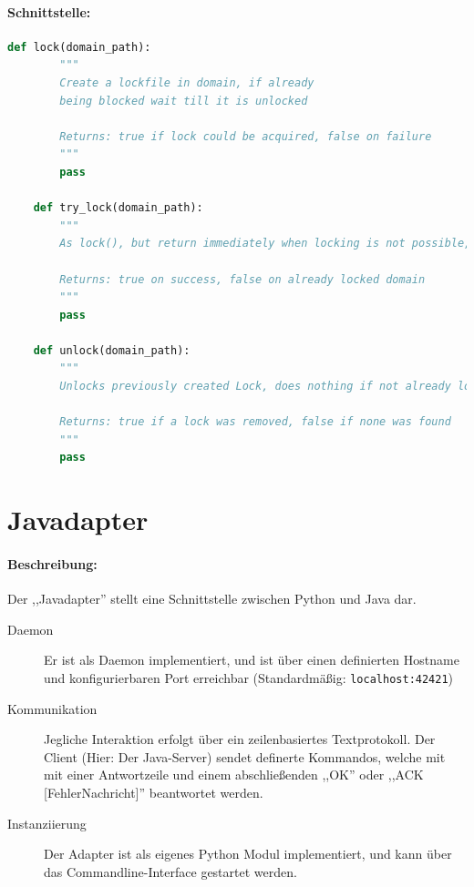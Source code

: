 \paragraph{Schnittstelle:}
\label{par:schnittstelle_}
\begin{lstlisting}[language=python]
    def lock(domain_path):
        """
        Create a lockfile in domain, if already
        being blocked wait till it is unlocked

        Returns: true if lock could be acquired, false on failure
        """
        pass

    def try_lock(domain_path):
        """
        As lock(), but return immediately when locking is not possible,

        Returns: true on success, false on already locked domain
        """
        pass

    def unlock(domain_path):
        """
        Unlocks previously created Lock, does nothing if not already locked.

        Returns: true if a lock was removed, false if none was found
        """
        pass
\end{lstlisting}



\section{Javadapter} 
\label{sec:javadapter}
\paragraph{Beschreibung:}
\label{par:beschreibung_}
Der ,,Javadapter'' stellt eine Schnittstelle zwischen Python und Java dar.
\begin{description}
  \item [Daemon] Er ist als Daemon implementiert, und ist über einen
    definierten Hostname und konfigurierbaren Port erreichbar 
    (Standardmäßig: \texttt{localhost:42421})
  \item [Kommunikation] Jegliche Interaktion erfolgt über ein
    zeilenbasiertes Textprotokoll. Der Client (Hier: Der Java-Server)
    sendet definerte Kommandos, welche mit mit einer Antwortzeile
    und einem abschließenden ,,OK'' oder ,,ACK [FehlerNachricht]''
    beantwortet werden.
  \item [Instanziierung] Der Adapter ist als eigenes Python Modul
    implementiert, und kann über das Commandline-Interface gestartet
    werden.
\end{description}
 

